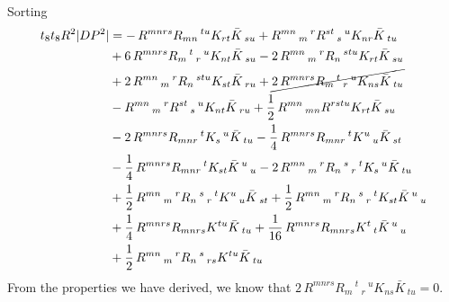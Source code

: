 Sorting
\begin{equation}
\begin{aligned}
t_8 t_8 R^2 |DP^2|
&=-\,R^{m n r s} R_{m n}\,^{t u} K_{r t} \bar{K}\,_{s u}
+R^{m n}\,_{m}\,^{r} R^{s t}\,_{s}\,^{u} K_{n r} \bar{K}\,_{t u}\\
&+6\,R^{m n r s} R_{m}\,^{t}\,_{r}\,^{u} K_{n t} \bar{K}\,_{s u}
-2\,R^{m n}\,_{m}\,^{r} R_{n}\,^{s t u} K_{r t} \bar{K}\,_{s u}\\
&+2\,R^{m n}\,_{m}\,^{r} R_{n}\,^{s t u} K_{s t} \bar{K}\,_{r u}
+\cancel{2\,R^{m n r s} R_{m}\,^{t}\,_{r}\,^{u} K_{n s} \bar{K}\,_{t u}}\\
&-R^{m n}\,_{m}\,^{r} R^{s t}\,_{s}\,^{u} K_{n t} \bar{K}\,_{r u}
+\frac{1}{2}\,R^{m n}\,_{m n} R^{r s t u} K_{r t} \bar{K}\,_{s u}\\
&-2\,R^{m n r s} R_{m n r}\,^{t} K_{s}\,^{u} \bar{K}\,_{t u}
-\frac{1}{4}\,R^{m n r s} R_{m n r}\,^{t} K^{u}\,_{u} \bar{K}\,_{s t}\\
&-\frac{1}{4}\,R^{m n r s} R_{m n r}\,^{t} K_{s t} \bar{K}\,^{u}\,_{u}
-2\,R^{m n}\,_{m}\,^{r} R_{n}\,^{s}\,_{r}\,^{t} K_{s}\,^{u} \bar{K}\,_{t u}\\
&+\frac{1}{2}\,R^{m n}\,_{m}\,^{r} R_{n}\,^{s}\,_{r}\,^{t} K^{u}\,_{u} \bar{K}\,_{s t}
+\frac{1}{2}\,R^{m n}\,_{m}\,^{r} R_{n}\,^{s}\,_{r}\,^{t} K_{s t} \bar{K}\,^{u}\,_{u}\\
&+\frac{1}{4}\,R^{m n r s} R_{m n r s} K^{t u} \bar{K}\,_{t u}
+\frac{1}{16}\,R^{m n r s} R_{m n r s} K^{t}\,_{t} \bar{K}\,^{u}\,_{u}\\
&+\frac{1}{2}\,R^{m n}\,_{m}\,^{r} R_{n}\,^{s}\,_{r s} K^{t u} \bar{K}\,_{t u}
\end{aligned}
\end{equation}
From the properties we have derived, we know that $2\,R^{m n r s} R_{m}\,^{t}\,_{r}\,^{u} K_{n s} \bar{K}\,_{t u} = 0$.


